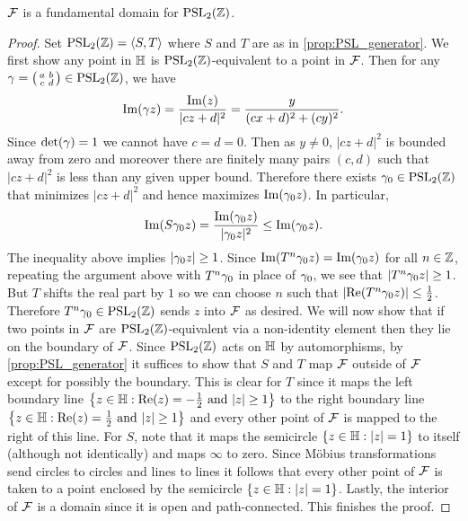     \begin{proposition}\label{prop:fundamental_domain_modular_group}
      $\mathcal{F}$ is a fundamental domain for $\mathrm{PSL}_{2}(\mathbb{Z})$.
    \end{proposition}
    \begin{proof}
      Set $\mathrm{PSL}_{2}(\mathbb{Z}) = \langle S,T\rangle$ where $S$ and $T$ are as in \cref{prop:PSL_generator}. We first show any point in $\mathbb{H}$ is $\mathrm{PSL}_{2}(\mathbb{Z})$-equivalent to a point in $\mathcal{F}$. Then for any $\gamma = \begin{psmallmatrix} a & b \\ c & d \end{psmallmatrix} \in \mathrm{PSL}_{2}(\mathbb{Z})$, we have
      \[
        \mathrm{Im}(\gamma z) = \frac{\mathrm{Im}(z)}{|cz+d|^{2}} = \frac{y}{(cx+d)^{2}+(cy)^{2}}.
      \]
      Since $\det(\gamma) = 1$ we cannot have $c = d = 0$. Then as $y \neq 0$, $|cz+d|^{2}$ is bounded away from zero and moreover there are finitely many pairs $(c,d)$ such that $|cz+d|^{2}$ is less than any given upper bound. Therefore there exists $\gamma_{0} \in \mathrm{PSL}_{2}(\mathbb{Z})$ that minimizes $|cz+d|^{2}$ and hence maximizes $\mathrm{Im}(\gamma_{0}z)$. In particular,
      \[
        \mathrm{Im}(S\gamma_{0}z) = \frac{\mathrm{Im}(\gamma_{0}z)}{|\gamma_{0}z|^{2}} \le \mathrm{Im}(\gamma_{0}z).
      \]
      The inequality above implies $|\gamma_{0}z| \ge 1$. Since $\mathrm{Im}(T^{n}\gamma_{0}z) = \mathrm{Im}(\gamma_{0}z)$ for all $n \in \mathbb{Z}$, repeating the argument above with $T^{n}\gamma_{0}$ in place of $\gamma_{0}$, we see that $|T^{n}\gamma_{0}z| \ge 1$. But $T$ shifts the real part by $1$ so we can choose $n$ such that $|\mathrm{Re}(T^{n}\gamma_{0}z)| \le \frac{1}{2}$. Therefore $T^{n}\gamma_{0} \in \mathrm{PSL}_{2}(\mathbb{Z})$ sends $z$ into $\mathcal{F}$ as desired. We will now show that if two points in $\mathcal{F}$ are $\mathrm{PSL}_{2}(\mathbb{Z})$-equivalent via a non-identity element then they lie on the boundary of $\mathcal{F}$. Since $\mathrm{PSL}_{2}(\mathbb{Z})$ acts on $\mathbb{H}$ by automorphisms, by \cref{prop:PSL_generator} it suffices to show that $S$ and $T$ map $\mathcal{F}$ outside of $\mathcal{F}$ except for possibly the boundary. This is clear for $T$ since it maps the left boundary line $\left\{z \in \mathbb{H}:\text{$\mathrm{Re}(z) = -\frac{1}{2}$ and $|z| \ge 1$}\right\}$ to the right boundary line $\left\{z \in \mathbb{H}:\text{$\mathrm{Re}(z) = \frac{1}{2}$ and $|z| \ge 1$}\right\}$ and every other point of $\mathcal{F}$ is mapped to the right of this line. For $S$, note that it maps the semicircle $\{z \in \mathbb{H}:|z| = 1\}$ to itself (although not identically) and maps $\infty$ to zero. Since M\"obius transformations send circles to circles and lines to lines it follows that every other point of $\mathcal{F}$ is taken to a point enclosed by the semicircle $\{z \in \mathbb{H}:|z| = 1\}$. Lastly, the interior of $\mathcal{F}$ is a domain since it is open and path-connected. This finishes the proof.
    \end{proof}

